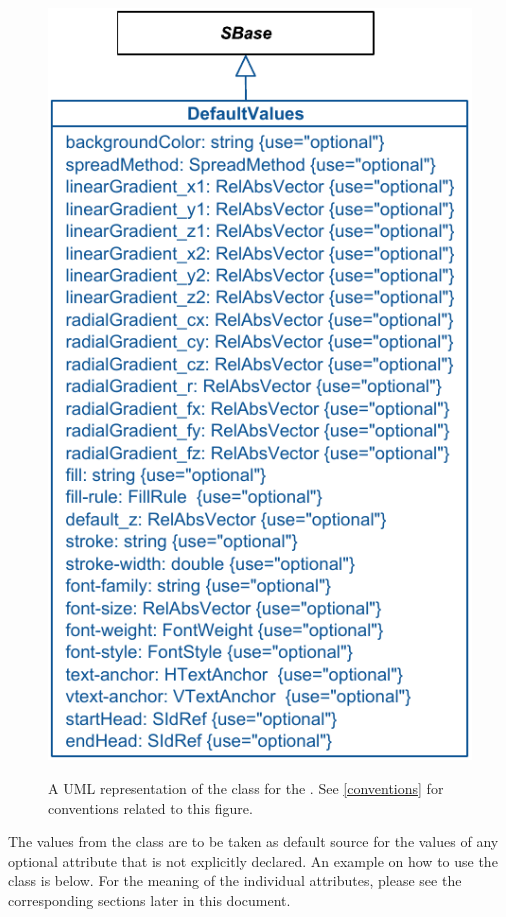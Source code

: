 \begin{figure}[h!]
  \centering
  \includegraphics{images/render-default-values}\\
  \caption{A UML representation of the \DefaultValues class for the \RenderPackage.  See \ref{conventions} for conventions related to this figure. }
  \label{fig:default-values}
\end{figure}

The values from the \DefaultValues class are to be taken as 
default source for the values of any optional attribute that is not explicitly declared. An example on how to use the \DefaultValues 
class is below. For the meaning of the individual attributes, please see the 
corresponding sections later in this document. 


